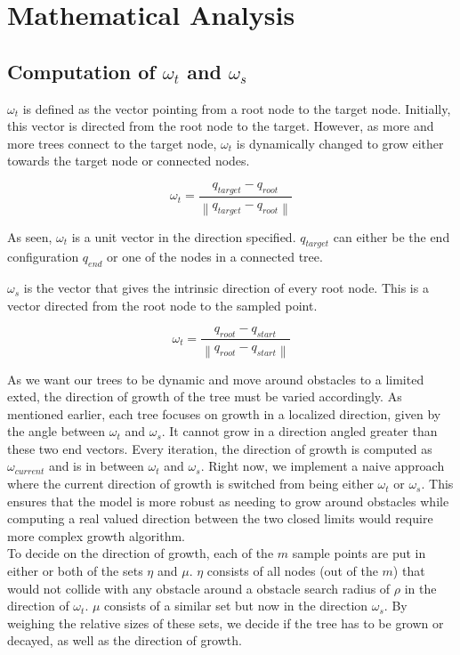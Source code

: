 \documentclass[fleqn]{article}
\newcommand{\norm}[1]{\left\lVert #1 \right\rVert}
\begin{document}
	\section*{Mathematical Analysis}
	\subsection*{Computation of  $\omega_t$ and  $\omega_s$ }
	$\omega_t$ is defined as the vector pointing from a root node to the target node. Initially, this vector is directed from the root node to the target. However, as more and more trees connect to the target node,  $\omega_t$ is dynamically changed to grow either towards the target node or connected nodes.
	
	\[\omega_t = \frac{q_{target} - q_{root}}{\norm{q_{target} - q_{root}}}\]
	
	As seen, $\omega_t$ is a unit vector in the direction specified. $q_{target}$ can either be the end configuration $q_{end}$ or one of the nodes in a connected tree.
	
	
	$\omega_s$ is the vector that gives the intrinsic direction of every root node. This is a vector directed from the root node to the sampled point. 
	
	\[\omega_t = \frac{q_{root} - q_{start}}{\norm{q_{root} - q_{start}}}\]
	
	As we want our trees to be dynamic and move around obstacles to a limited exted, the direction of growth of the tree must be varied accordingly. As mentioned earlier, each tree focuses on growth in a localized direction, given by the angle between $\omega_t$ and $\omega_s$. It cannot grow in a direction angled greater than these two end vectors. Every iteration, the direction of growth is computed as $\omega_{current}$ and is in between $\omega_t$ and $\omega_s$. Right now, we implement a naive approach where the current direction of growth is switched from being either $\omega_t$ or $\omega_s$. This ensures that the model is more robust as needing to grow around obstacles while computing a real valued direction between the two closed limits would require more complex growth algorithm.
	\\
	
	To decide on the direction of growth, each of the $m$ sample points are put in either or both of the sets $\eta$ and $\mu$. $\eta$ consists of all nodes (out of the $m$) that would not collide with any obstacle around a obstacle search radius of $\rho$ in the direction of $\omega_t$. $\mu$ consists of a similar set but now in the direction $\omega_s$. By weighing the relative sizes of these sets, we decide if the tree has to be grown or decayed, as well as the direction of growth.
	
\end{document}

